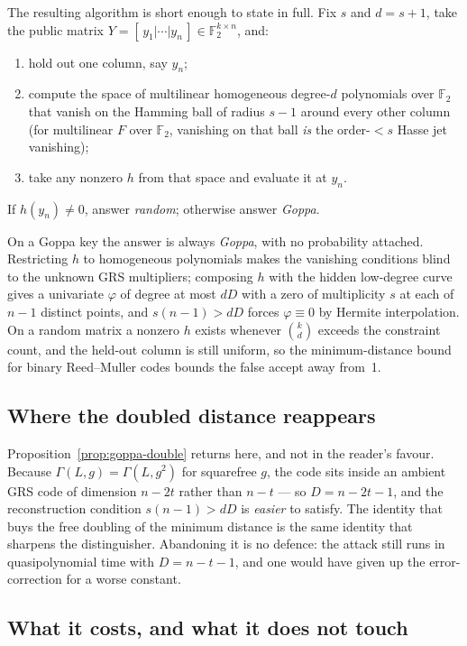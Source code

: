 The resulting algorithm is short enough to state in full. Fix $s$ and $d = s+1$, take the public matrix $Y = [\,y_1|\cdots|y_n\,] \in \mathbb{F}_2^{k\times n}$, and:

\begin{enumerate}
  \item hold out one column, say $y_n$;
  \item compute the space of multilinear homogeneous degree-$d$ polynomials over $\mathbb{F}_2$ that vanish on the Hamming ball of radius $s-1$ around every other column (for multilinear $F$ over $\mathbb{F}_2$, vanishing on that ball \emph{is} the order-$<s$ Hasse jet vanishing);
  \item take any nonzero $h$ from that space and evaluate it at $y_n$.
\end{enumerate}

If $h(y_n) \ne 0$, answer \emph{random}; otherwise answer \emph{Goppa}.

On a Goppa key the answer is always \emph{Goppa}, with no probability attached. Restricting $h$ to homogeneous polynomials makes the vanishing conditions blind to the unknown GRS multipliers; composing $h$ with the hidden low-degree curve gives a univariate $\varphi$ of degree at most $dD$ with a zero of multiplicity $s$ at each of $n-1$ distinct points, and $s(n-1) > dD$ forces $\varphi \equiv 0$ by Hermite interpolation. On a random matrix a nonzero $h$ exists whenever $\binom{k}{d}$ exceeds the constraint count, and the held-out column is still uniform, so the minimum-distance bound for binary Reed--Muller codes bounds the false accept away from~1.

\subsection{Where the doubled distance reappears}

Proposition~\ref{prop:goppa-double} returns here, and not in the reader's favour. Because $\Gamma(L,g) = \Gamma(L,g^2)$ for squarefree $g$, the code sits inside an ambient GRS code of dimension $n-2t$ rather than $n-t$ --- so $D = n-2t-1$, and the reconstruction condition $s(n-1) > dD$ is \emph{easier} to satisfy. The identity that buys the free doubling of the minimum distance is the same identity that sharpens the distinguisher. Abandoning it is no defence: the attack still runs in quasipolynomial time with $D = n-t-1$, and one would have given up the error-correction for a worse constant.

\subsection{What it costs, and what it does not touch}

